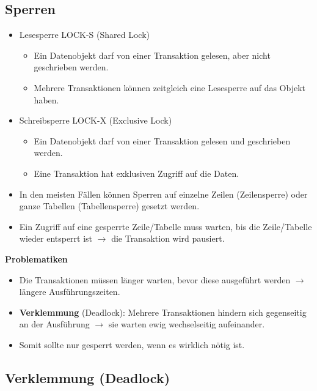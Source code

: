 		\subsection{Sperren} %
			\begin{itemize}
				\item Lesesperre LOCK-S (Shared Lock)
					\begin{itemize}
						\item Ein Datenobjekt darf von einer Transaktion gelesen, aber nicht geschrieben werden.
						\item Mehrere Transaktionen können zeitgleich eine Lesesperre auf das Objekt haben.
					\end{itemize}
				\item Schreibsperre LOCK-X (Exclusive Lock)
					\begin{itemize}
						\item Ein Datenobjekt darf von einer Transaktion gelesen und geschrieben werden.
						\item Eine Transaktion hat exklusiven Zugriff auf die Daten.
					\end{itemize}
				\item In den meisten Fällen können Sperren auf einzelne Zeilen (Zeilensperre) oder ganze Tabellen (Tabellensperre) gesetzt werden.
				\item Ein Zugriff auf eine gesperrte Zeile/Tabelle muss warten, bis die Zeile/Tabelle wieder entsperrt ist \(\rightarrow\) die Transaktion wird pausiert.
			\end{itemize}

			\textbf{Problematiken}
			\begin{itemize}
				\item Die Transaktionen müssen länger warten, bevor diese ausgeführt werden \(\rightarrow\) längere Ausführungszeiten.
				\item \textbf{Verklemmung} (Deadlock): Mehrere Transaktionen hindern sich gegenseitig an der Ausführung \(\rightarrow\) sie warten ewig wechselseitig aufeinander.
				\item Somit sollte nur gesperrt werden, wenn es wirklich nötig ist.
			\end{itemize}

		\subsection{Verklemmung (Deadlock)} %
			\label{sec:deadlock}

